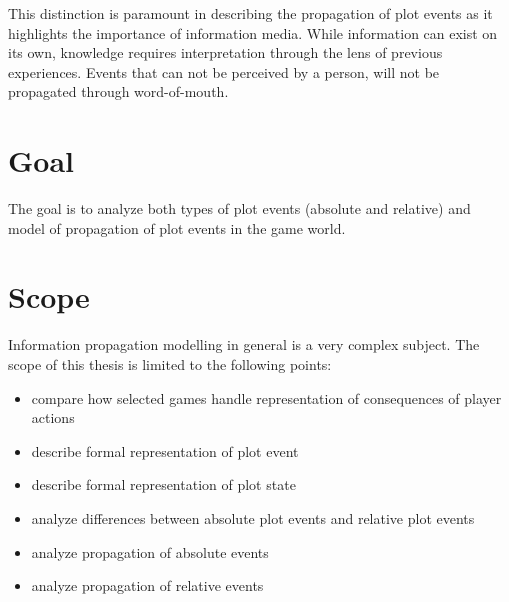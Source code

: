 This distinction is paramount in describing the propagation of plot events as it highlights the importance of information media. While information can exist on its own, knowledge requires interpretation through the lens of previous experiences.
Events that can not be perceived by a person, will not be propagated through word-of-mouth.

\section*{Goal}

The goal is to analyze both types of plot events (absolute and relative) and model of propagation of plot events in the game world.

\section*{Scope}

Information propagation modelling in general is a very complex subject.
The scope of this thesis is limited to the following points:

\begin{itemize}
    \item compare how selected games handle representation of consequences of player actions
    \item describe formal representation of plot event
    \item describe formal representation of plot state
    \item analyze differences between absolute plot events and relative plot events
    \item analyze propagation of absolute events
    \item analyze propagation of relative events
\end{itemize}
